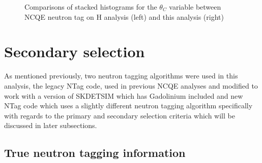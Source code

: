 \begin{figure}[!htbp]
    \centering
    
    \caption{Comparisons of stacked histograms for the $\theta_C$ variable between NCQE neutron tag on H analysis (left) and this analysis (right)} \label{fig:angle_reduction} 
    
     \hfill 
     \par
    
        
\end{figure}



\section{Secondary selection}

As mentioned previously, two neutron tagging algorithms were used in this analysis, the legacy NTag code, used in previous NCQE analyses and modified to work with a version of SKDETSIM which has Gadolinium included and new NTag code which uses a slightly different neutron tagging algorithm specifically with regards to the primary and secondary selection criteria which will be discussed in later subsections.



\subsection{True neutron tagging information}


